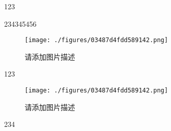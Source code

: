 
123

234345456

\begin{figure}[ht]
\centering
\texttt{[image: ./figures/03487d4fdd589142.png]}
\caption{请添加图片描述} \label{fig_qwijdh_1}
\end{figure}

123
\begin{figure}[ht]
\centering
\texttt{[image: ./figures/03487d4fdd589142.png]}
\caption{请添加图片描述} \label{fig_qwijdh_2}
\end{figure}

234
